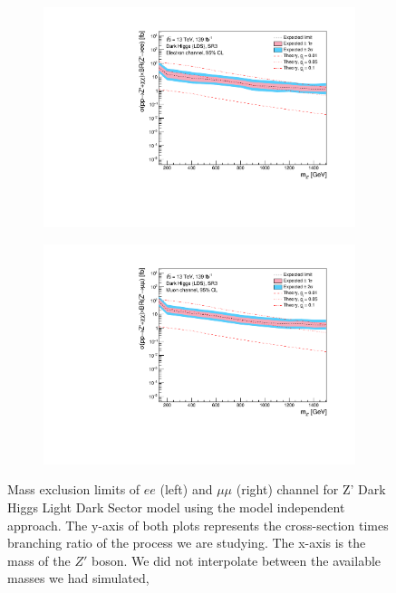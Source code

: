 \documentclass[12pt, a4paper]{book}
\begin{document}
\begin{figure}[!ht]
\begin{subfigure}[b]{0.49\textwidth}
      \includegraphics[width=1\textwidth]{Limits/Model_independent/150/DH_LDS/mass_exclusion_ee.pdf}
   \end{subfigure}
   \hfill
   \begin{subfigure}[b]{0.49\textwidth}
      \centering
      \includegraphics[width=1\textwidth]{Limits/Model_independent/150/DH_LDS/mass_exclusion_uu.pdf}
   \end{subfigure}
   \caption[Expected mass exclusion limits results for DH LDS model on $ee$ and $\mu\mu$ channel using the model independent approach]{Mass exclusion limits of $ee$ (left) and $\mu\mu$ (right) channel for Z' Dark Higgs Light Dark Sector model using the model independent approach. The y-axis of both plots represents the cross-section times branching ratio of the process we are studying. The x-axis is the mass of the $Z'$ boson. We did not interpolate between the available masses we had simulated, 
}
\end{figure}
\end{document}
